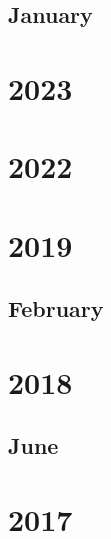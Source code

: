 \documentclass[12pt]{article}
\begin{document}
\subsection{January}
\begin{refsection}
    \nocite{deepseek-ai_deepseek-v2_2024}
    \printbibliography[heading=none]
\end{refsection}


\newpage
\section{2023}


\newpage
\section{2022}


\newpage
\section{2019}
\subsection{February}
\begin{refsection}
    \nocite{radford_language_2019}
    \printbibliography[heading=none]
\end{refsection}


\newpage
\section{2018}
\subsection{June}
\begin{refsection}
    \nocite{radford_improving_nodate}
    \printbibliography[heading=none]
\end{refsection}


\newpage
\section{2017}
\begin{refsection}
    \nocite{vaswani2023attentionneed}
    \printbibliography[heading=none]
\end{refsection}
\end{document}
